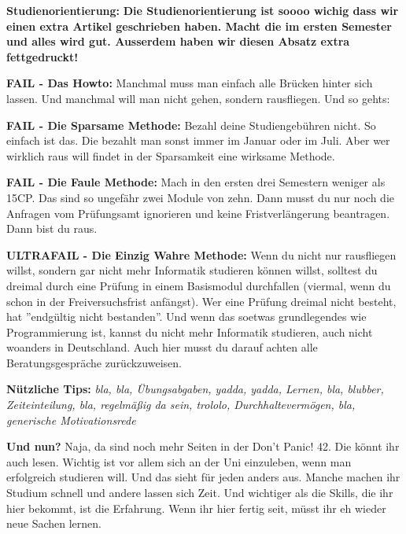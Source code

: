 \textbf{Studienorientierung:}
\textbf{
Die Studienorientierung ist soooo wichig dass wir einen extra Artikel geschrieben haben. Macht die im ersten Semester und alles wird gut. Ausserdem haben wir diesen Absatz extra fettgedruckt!}

\textbf{FAIL - Das Howto:}
Manchmal muss man einfach alle Br\"ucken hinter sich lassen. Und manchmal will man nicht gehen, sondern rausfliegen. Und so gehts:

\textbf{FAIL - Die Sparsame Methode:}
Bezahl deine Studiengeb\"uhren nicht. So einfach ist das. Die bezahlt man sonst immer im Januar oder im Juli. Aber wer wirklich raus will findet in der Sparsamkeit eine wirksame Methode.

\textbf{FAIL - Die Faule Methode:}
Mach in den ersten drei Semestern weniger als 15CP. Das sind so ungef\"ahr zwei Module von zehn. Dann musst du nur noch die Anfragen vom Pr\"ufungsamt ignorieren und keine Fristverl\"angerung beantragen. Dann bist du raus.

\textbf{ULTRAFAIL - Die Einzig Wahre Methode:}
Wenn du nicht nur rausfliegen willst, sondern gar nicht mehr Informatik
studieren k\"onnen willst, solltest du dreimal durch eine Pr\"ufung in einem
Basismodul durchfallen (viermal, wenn du schon in der Freiversuchsfrist
anf\"angst). Wer eine Pr\"ufung dreimal nicht besteht, hat ''endg\"ultig nicht
bestanden''. Und wenn das soetwas grundlegendes wie Programmierung ist, kannst
du nicht mehr Informatik studieren, auch nicht woanders in Deutschland. Auch
hier musst du darauf achten alle Beratungsgespr\"ache zur\"uckzuweisen.

\textbf{N\"utzliche Tips:}
\emph{bla, bla, \"Ubungsabgaben, yadda, yadda, Lernen, bla, blubber, Zeiteinteilung, bla, regelm\"a{\ss}ig da sein, trololo, Durchhalteverm\"ogen, bla, generische Motivationsrede}

\textbf{Und nun?}
Naja, da sind noch mehr Seiten in der Don't Panic! 42. Die k\"onnt ihr auch
lesen. Wichtig ist vor allem sich an der Uni einzuleben, wenn man erfolgreich
studieren will. Und das sieht f\"ur jeden anders aus. Manche machen ihr Studium
schnell und andere lassen sich Zeit. Und wichtiger als die Skills, die ihr hier
bekommt, ist die Erfahrung. Wenn ihr hier fertig seit, m\"usst ihr eh wieder
neue Sachen lernen.






